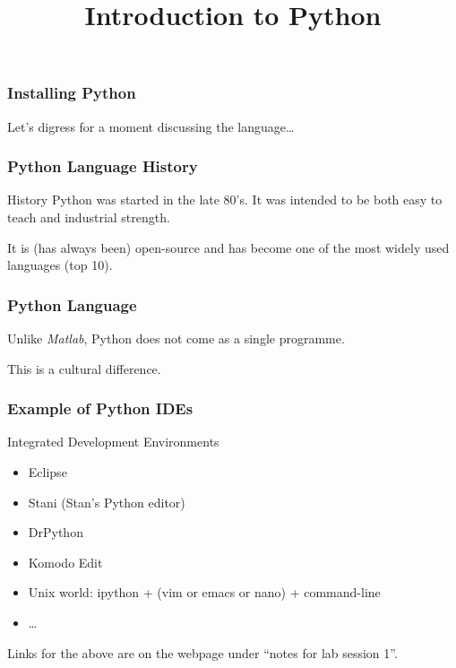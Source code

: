 
\title{Introduction to Python}


\frame{\maketitle}

\begin{frame}[fragile]
\frametitle{Installing Python}

Let's digress for a moment discussing the language\ldots
\end{frame}


\begin{frame}[fragile]
\frametitle{Python Language History}

\begin{block}{History}
Python was started in the late 80's. It was intended to be both \alert{easy to teach} and \alert{industrial strength}.

It is (has always been) open-source and has become one of the most widely used languages (top 10).
\end{block}
\end{frame}

\begin{frame}[fragile]
\frametitle{Python Language}

Unlike \textit{Matlab}, Python does not come as a single programme.

This is a cultural difference.

\end{frame}

\begin{frame}[fragile]
\frametitle{Example of Python IDEs}

\begin{block}{Integrated Development Environments}
\begin{itemize}
\item Eclipse
\item Stani (Stan's Python editor)
\item DrPython
\item Komodo Edit
\item Unix world: ipython + (vim or emacs or nano) + command-line
\item \ldots
\end{itemize}
\end{block}

Links for the above are on the webpage under ``notes for lab session 1''.
\end{frame}

